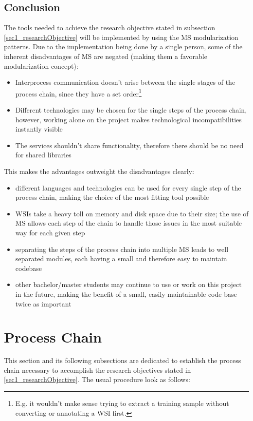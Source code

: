 \subsection{Conclusion}	
The tools needed to achieve the research objective stated in subsection \ref{sec1_researchObjective} will be implemented by using the MS modularization patterns. Due to the implementation being done by a single person, some of the inherent disadvantages of MS are negated (making them a favorable modularization concept):
\begin{itemize}
	\item Interprocess communication doesn't arise between the single stages of the process chain, since they have a set order\footnote{E.g. it wouldn't make sense trying to extract a training sample without converting or annotating a WSI first.}
	\item Different technologies may be chosen for the single steps of the process chain, however, working alone on the project makes technological incompatibilities instantly visible
	\item The services shouldn't share functionality, therefore there should be no need for shared libraries
\end{itemize}
This makes the advantages outweight the disadvantages clearly:
\begin{itemize}
	\item different languages and technologies can be used for every single step of the process chain, making the choice of the most fitting tool possible
	\item WSIs take a heavy toll on memory and disk space due to their size; the use of MS allows each step of the chain to handle those issues in the most suitable way for each given step
	\item separating the steps of the process chain into multiple MS leads to well separated modules, each having a small and therefore easy to maintain codebase
	\item other bachelor/master students may continue to use or work on this project in the future, making the benefit of a small, easily maintainable code base twice as important
\end{itemize}


\section{Process Chain}
\label{sec2_pc}
This section and its following subsections are dedicated to establish the process chain necessary to accomplish the research objectives stated in \ref{sec1_researchObjective}. The usual procedure look as follows:

